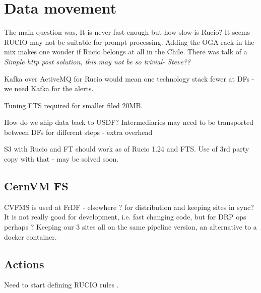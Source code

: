 \section{Data movement}

The main question was, It is never fast enough but how slow is Rucio?
It seems RUCIO may not be suitable for prompt processing.
Adding the OGA rack in the mix makes one wonder if Rucio belongs at all in the Chile.
There was talk of a \em{Simple} http post solution, this may not be so trivial- Steve??

Kafka over ActiveMQ for Rucio would mean one technology stack fewer at DFs - we need Kafka for the alerts.

Tuning FTS required for smaller filed 20MB.

How do we ship data back to USDF?
Intermediaries may need to be transported between DFs for different steps - extra overhead

S3 with Rucio and FT should work as of Rucio 1.24 and FTS.
Use of 3rd party copy with that - may be solved soon.

\subsection{CernVM FS}
CVFMS is used at FrDF - elsewhere ? for distribution and keeping sites in sync?
It is not really good for development, i.e. fast changing code,  but for DRP ops perhaps ?
Keeping our 3 sites all on the same pipeline version, an alternative to a docker container.

\subsection {Actions}
Need to start defining RUCIO rules .

